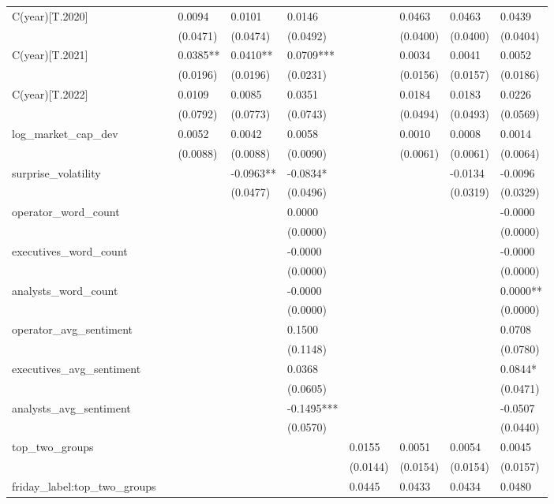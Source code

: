 \begin{tabular}{lllllllll}
C(year)[T.2020] &  & 0.0094 & 0.0101 & 0.0146 &  & 0.0463 & 0.0463 & 0.0439 \\
 &  & (0.0471) & (0.0474) & (0.0492) &  & (0.0400) & (0.0400) & (0.0404) \\
C(year)[T.2021] &  & 0.0385** & 0.0410** & 0.0709*** &  & 0.0034 & 0.0041 & 0.0052 \\
 &  & (0.0196) & (0.0196) & (0.0231) &  & (0.0156) & (0.0157) & (0.0186) \\
C(year)[T.2022] &  & 0.0109 & 0.0085 & 0.0351 &  & 0.0184 & 0.0183 & 0.0226 \\
 &  & (0.0792) & (0.0773) & (0.0743) &  & (0.0494) & (0.0493) & (0.0569) \\
log_market_cap_dev &  & 0.0052 & 0.0042 & 0.0058 &  & 0.0010 & 0.0008 & 0.0014 \\
 &  & (0.0088) & (0.0088) & (0.0090) &  & (0.0061) & (0.0061) & (0.0064) \\
surprise_volatility &  &  & -0.0963** & -0.0834* &  &  & -0.0134 & -0.0096 \\
 &  &  & (0.0477) & (0.0496) &  &  & (0.0319) & (0.0329) \\
operator_word_count &  &  &  & 0.0000 &  &  &  & -0.0000 \\
 &  &  &  & (0.0000) &  &  &  & (0.0000) \\
executives_word_count &  &  &  & -0.0000 &  &  &  & -0.0000 \\
 &  &  &  & (0.0000) &  &  &  & (0.0000) \\
analysts_word_count &  &  &  & -0.0000 &  &  &  & 0.0000** \\
 &  &  &  & (0.0000) &  &  &  & (0.0000) \\
operator_avg_sentiment &  &  &  & 0.1500 &  &  &  & 0.0708 \\
 &  &  &  & (0.1148) &  &  &  & (0.0780) \\
executives_avg_sentiment &  &  &  & 0.0368 &  &  &  & 0.0844* \\
 &  &  &  & (0.0605) &  &  &  & (0.0471) \\
analysts_avg_sentiment &  &  &  & -0.1495*** &  &  &  & -0.0507 \\
 &  &  &  & (0.0570) &  &  &  & (0.0440) \\
top_two_groups &  &  &  &  & 0.0155 & 0.0051 & 0.0054 & 0.0045 \\
 &  &  &  &  & (0.0144) & (0.0154) & (0.0154) & (0.0157) \\
friday_label:top_two_groups &  &  &  &  & 0.0445 & 0.0433 & 0.0434 & 0.0480 \\

\end{tabular}
